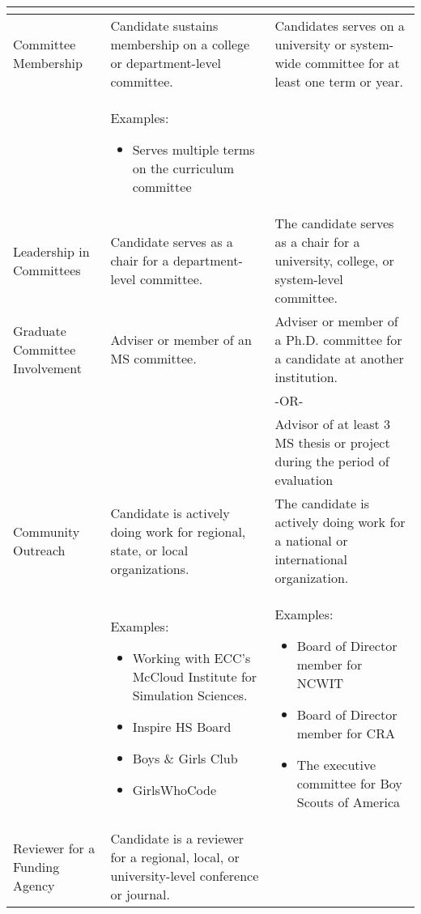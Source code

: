 \documentclass{article}
\begin{document}
\begin{longtable}{p{3cm}p{5.5cm}P{5.5cm}}
\begin{itemize}[noitemsep,leftmargin=*,topsep=0pt,partopsep=0pt]
	\end{itemize} & \\ \hline
Committee Membership & Candidate sustains membership on a college or department-level committee. & Candidates serves on a university or system-wide committee for at least one term or year. \\
& Examples:
	\begin{itemize}[noitemsep,leftmargin=*,topsep=0pt,partopsep=0pt]
    \item Serves multiple terms on the curriculum committee
	\end{itemize} & \\ \hline
Leadership in Committees & Candidate serves as a chair for a department-level committee. & The candidate serves as a chair for a university, college, or system-level committee. \\ \hline
Graduate Committee Involvement & Adviser or member of an MS committee. & Adviser or member of a Ph.D. committee for a candidate at another institution.\\ 
& & -OR- \\
& & Advisor of at least 3 MS thesis or project during the period of evaluation \\
\hline
 Community Outreach & Candidate is actively doing work for regional, state, or local organizations. & The candidate is actively doing work for a national or international organization. \\
 &
 Examples:
	\begin{itemize}[noitemsep,leftmargin=*,topsep=0pt,partopsep=0pt]
    \item Working with ECC’s McCloud Institute for Simulation Sciences.
    \item Inspire HS Board
    \item Boys \& Girls Club
    \item GirlsWhoCode
	\end{itemize}
  & %
  Examples:
    \begin{itemize}[noitemsep,leftmargin=*,topsep=0pt,partopsep=0pt]
        \item Board of Director member for NCWIT
        \item Board of Director member for CRA
        \item The executive committee for Boy Scouts of America
    \end{itemize}\\ 
\hline
 Reviewer for a Funding Agency
 & Candidate is a reviewer for a regional, local, or university-level conference or journal.%

\end{longtable}
\end{document}
